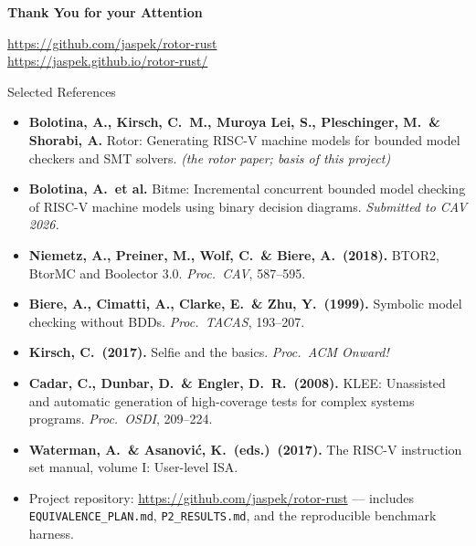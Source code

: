 \documentclass[aspectratio=169]{beamer}
\begin{document}
\begin{frame}
  \centering
  \Huge{\textbf{Thank You for your Attention}}
  \vspace{0.8cm}

  \normalsize
  \url{https://github.com/jaspek/rotor-rust}\\
  \url{https://jaspek.github.io/rotor-rust/}
\end{frame}

\begin{frame}[allowframebreaks]{Selected References}
  \footnotesize
  \begin{itemize}\setlength\itemsep{0.4em}
    \item \textbf{Bolotina, A., Kirsch, C.\ M., Muroya Lei, S.,
          Pleschinger, M.\ \& Shorabi, A.} Rotor: Generating RISC-V
          machine models for bounded model checkers and SMT solvers.
          \textit{(the rotor paper; basis of this project)}
    \item \textbf{Bolotina, A.\ et al.} Bitme: Incremental concurrent
          bounded model checking of RISC-V machine models using binary
          decision diagrams. \textit{Submitted to CAV 2026.}
    \item \textbf{Niemetz, A., Preiner, M., Wolf, C.\ \& Biere, A.\
          (2018).} BTOR2, BtorMC and Boolector 3.0.
          \textit{Proc.\ CAV}, 587--595.
    \item \textbf{Biere, A., Cimatti, A., Clarke, E.\ \& Zhu, Y.\
          (1999).} Symbolic model checking without BDDs.
          \textit{Proc.\ TACAS}, 193--207.
    \item \textbf{Kirsch, C.\ (2017).} Selfie and the basics.
          \textit{Proc.\ ACM Onward!}
    \item \textbf{Cadar, C., Dunbar, D.\ \& Engler, D.\ R.\ (2008).}
          KLEE: Unassisted and automatic generation of high-coverage
          tests for complex systems programs. \textit{Proc.\ OSDI},
          209--224.
    \item \textbf{Waterman, A.\ \& Asanovi\'{c}, K.\ (eds.)\ (2017).}
          The RISC-V instruction set manual, volume I: User-level ISA.
    \item Project repository:
          \url{https://github.com/jaspek/rotor-rust} --- includes
          \texttt{EQUIVALENCE\_PLAN.md}, \texttt{P2\_RESULTS.md}, and
          the reproducible benchmark harness.
  \end{itemize}
\end{frame}
\end{document}
